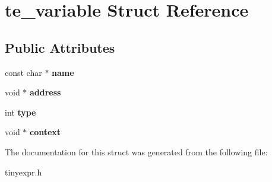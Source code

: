 \hypertarget{structte__variable}{}\section{te\+\_\+variable Struct Reference}
\label{structte__variable}
\subsection*{Public Attributes}
\begin{DoxyCompactItemize}
\item 
\mbox{\label{structte__variable_a94cf978c87b0c7da037d9cb70fd29987}} 
const char $\ast$ {\bfseries name}
\item 
\mbox{\label{structte__variable_afcafa7907f84bb022c0a7c6615da3914}} 
void $\ast$ {\bfseries address}
\item 
\mbox{\label{structte__variable_af07e006edd70271440a510748f6cd9c4}} 
int {\bfseries type}
\item 
\mbox{\label{structte__variable_a61e2ec3703bb3cd8519a4068b92399af}} 
void $\ast$ {\bfseries context}
\end{DoxyCompactItemize}


The documentation for this struct was generated from the following file\+:\begin{DoxyCompactItemize}
\item 
tinyexpr.\+h\end{DoxyCompactItemize}
